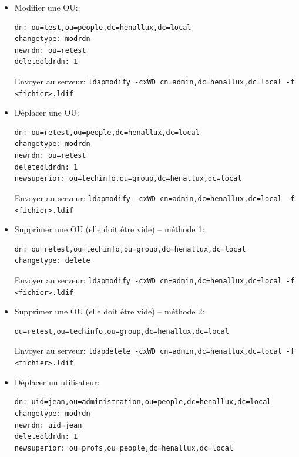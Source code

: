 \documentclass[a4paper]{article}
\begin{document}
\begin{itemize}
\item Modifier une OU:
\begin{example} \begin{verbatim}
dn: ou=test,ou=people,dc=henallux,dc=local
changetype: modrdn
newrdn: ou=retest
deleteoldrdn: 1    
\end{verbatim} \end{example}
Envoyer au serveur: \texttt{ldapmodify -cxWD cn=admin,dc=henallux,dc=local -f <fichier>.ldif}


\item Déplacer une OU:
\begin{example} \begin{verbatim}
dn: ou=retest,ou=people,dc=henallux,dc=local
changetype: modrdn
newrdn: ou=retest
deleteoldrdn: 1
newsuperior: ou=techinfo,ou=group,dc=henallux,dc=local
\end{verbatim} \end{example}
Envoyer au serveur: \texttt{ldapmodify -cxWD cn=admin,dc=henallux,dc=local -f <fichier>.ldif}


\item Supprimer une OU (elle doit être vide) -- méthode 1:
\begin{example} \begin{verbatim}
dn: ou=retest,ou=techinfo,ou=group,dc=henallux,dc=local
changetype: delete
\end{verbatim} \end{example}
Envoyer au serveur: \texttt{ldapmodify -cxWD cn=admin,dc=henallux,dc=local -f <fichier>.ldif}


\item Supprimer une OU (elle doit être vide) -- méthode 2:
\begin{example} \begin{verbatim}
ou=retest,ou=techinfo,ou=group,dc=henallux,dc=local
\end{verbatim} \end{example}
Envoyer au serveur: \texttt{ldapdelete -cxWD cn=admin,dc=henallux,dc=local -f <fichier>.ldif}


\item Déplacer un utilisateur:
\begin{example} \begin{verbatim}
dn: uid=jean,ou=administration,ou=people,dc=henallux,dc=local
changetype: modrdn
newrdn: uid=jean
deleteoldrdn: 1
newsuperior: ou=profs,ou=people,dc=henallux,dc=local
\end{verbatim} \end{example}



\end{itemize}
\end{document}
